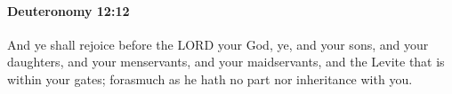 
		\paragraph{Deuteronomy 12:12} %
			\label{DEUTERONOMY-12-12}

			And ye shall rejoice before the LORD your God, ye, and your sons, and your daughters, and your menservants, and your maidservants, and the Levite that is within your gates; forasmuch as he hath no part nor inheritance with you.


